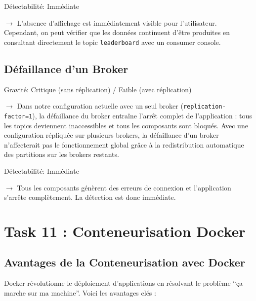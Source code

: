 \documentclass[10pt,a4paper]{article}
\begin{document}
Détectabilité: Immédiate

$\rightarrow$ L'absence d'affichage est immédiatement visible pour l'utilisateur. Cependant, on peut vérifier que les données continuent d'être produites en consultant directement le topic \texttt{leaderboard} avec un consumer console.

\subsection{Défaillance d'un Broker}

Gravité: Critique (sans réplication) / Faible (avec réplication)

$\rightarrow$ Dans notre configuration actuelle avec un seul broker (\texttt{replication-factor=1}), la défaillance du broker entraîne l'arrêt complet de l'application : tous les topics deviennent inaccessibles et tous les composants sont bloqués. Avec une configuration répliquée sur plusieurs brokers, la défaillance d'un broker n'affecterait pas le fonctionnement global grâce à la redistribution automatique des partitions sur les brokers restants.

Détectabilité: Immédiate

$\rightarrow$ Tous les composants génèrent des erreurs de connexion et l'application s'arrête complètement. La détection est donc immédiate.

\section{Task 11 : Conteneurisation Docker}

\subsection{Avantages de la Conteneurisation avec Docker}

Docker révolutionne le déploiement d'applications en résolvant le problème ``ça marche sur ma machine''. Voici les avantages clés :
\end{document}
